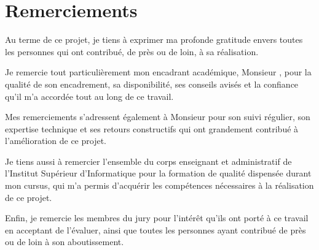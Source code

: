 \chapter*{\huge Remerciements}

\begin{center}
\it \Large
\end{center}

\normalsize\upshape\raggedright

Au terme de ce projet, je tiens à exprimer ma profonde gratitude envers toutes les personnes qui ont contribué, de près ou de loin, à sa réalisation.

\vspace{3mm}
Je remercie tout particulièrement mon encadrant académique, Monsieur \textbf{\@academicFramerName}, pour la qualité de son encadrement, sa disponibilité, ses conseils avisés et la confiance qu'il m'a accordée tout au long de ce travail.

\vspace{3mm}
Mes remerciements s'adressent également à Monsieur \textbf{\@proFramerName} pour son suivi régulier, son expertise technique et ses retours constructifs qui ont grandement contribué à l'amélioration de ce projet.

\vspace{3mm}
Je tiens aussi à remercier l'ensemble du corps enseignant et administratif de l'Institut Supérieur d'Informatique pour la formation de qualité dispensée durant mon cursus, qui m'a permis d'acquérir les compétences nécessaires à la réalisation de ce projet.

\vspace{3mm}
Enfin, je remercie les membres du jury pour l'intérêt qu'ils ont porté à ce travail en acceptant de l'évaluer, ainsi que toutes les personnes ayant contribué de près ou de loin à son aboutissement.
